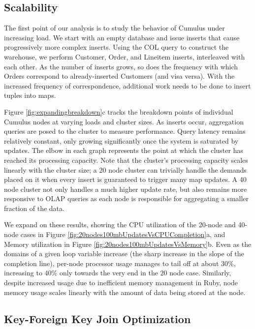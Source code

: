 \subsection{Scalability}

The first point of our analysis is to study the behavior of Cumulus under increasing load.  We start with an empty database and issue inserts that cause progressively more complex inserts.  Using the COL query to construct the warehouse, we perform Customer, Order, and Lineitem inserts, interleaved with each other.  As the number of inserts grows, so does the frequency with which Orders correspond to already-inserted Customers (and visa versa).  With the increased frequency of correspondence, additional work needs to be done to insert tuples into maps.  

Figure \ref{fig:expandingbreakdown}c tracks the breakdown points of individual Cumulus nodes at varying loads and cluster sizes.  As inserts occur, aggregation queries are posed to the cluster to measure performance.  Query latency remains relatively constant, only growing significantly once the system is saturated by updates.  The elbow in each graph represents the point at which the cluster has reached its processing capacity.  Note that the cluster's processing capacity scales linearly with the cluster size; a 20 node cluster can trivially handle the demands placed on it when every insert is guaranteed to trigger many map updates.  A 40 node cluster not only handles a much higher update rate, but also remains more responsive to OLAP queries as each node is responsible for aggregating a smaller fraction of the data.

We expand on these results, showing the CPU utilization of the 20-node and 40-node cases in Figure \ref{fig:20nodes100mbUpdatesVsCPUCompletion}a, and Memory utilization in Figure \ref{fig:20nodes100mbUpdatesVsMemory}b.  Even as the domains of a given loop variable increase (the sharp increase in the slope of the completion line), per-node processor usage manages to tail off at about 30\%, increasing to 40\% only towards the very end in the 20 node case.  Similarly, despite increased usage due to inefficient memory management in Ruby, node memory usage scales linearly with the amount of data being stored at the node.


\subsection{Key-Foreign Key Join Optimization}
\label{sec:key_fkey}

